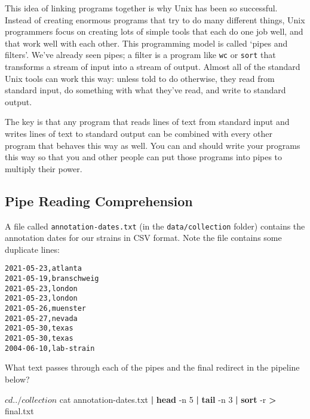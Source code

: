 \documentclass[
]{book}
\newenvironment{Shaded}{\begin{snugshade}}{\end{snugshade}}
\newcommand{\AttributeTok}[1]{\textcolor[rgb]{0.13,0.29,0.53}{#1}}
\newcommand{\ExtensionTok}[1]{#1}
\newcommand{\FunctionTok}[1]{\textcolor[rgb]{0.13,0.29,0.53}{\textbf{#1}}}
\newcommand{\KeywordTok}[1]{\textcolor[rgb]{0.13,0.29,0.53}{\textbf{#1}}}
\newcommand{\NormalTok}[1]{#1}
\newcommand{\OperatorTok}[1]{\textcolor[rgb]{0.81,0.36,0.00}{\textbf{#1}}}
\begin{document}
This idea of linking programs together is why Unix has been so successful. Instead of creating enormous programs that try to do many different things, Unix programmers focus on creating lots of simple tools that each do one job well, and that work well with each other. This programming model is called `pipes and filters'. We've already seen pipes; a filter is a program like \texttt{wc} or \texttt{sort} that transforms a stream of input into a stream of output. Almost all of the standard Unix tools can work this way: unless told to do otherwise, they read from standard input, do something with what they've read, and write to standard output.

The key is that any program that reads lines of text from standard input and writes lines of text to standard output can be combined with every other program that behaves this way as well. You can and should write your programs this way so that you and other people can put those programs into pipes to multiply their power.

\subsection{Pipe Reading Comprehension}\label{pipe-reading-comprehension}

A file called \texttt{annotation-dates.txt} (in the \texttt{data/collection} folder) contains the annotation dates for our strains in CSV format. Note the file contains some duplicate lines:

\begin{verbatim}
2021-05-23,atlanta
2021-05-19,branschweig
2021-05-23,london
2021-05-23,london
2021-05-26,muenster
2021-05-27,nevada
2021-05-30,texas
2021-05-30,texas
2004-06-10,lab-strain
\end{verbatim}

What text passes through each of the pipes and the final redirect in the pipeline below?

\begin{Shaded}
\begin{Highlighting}[]
\ExtensionTok{$}\NormalTok{ cd ../collection}
\ExtensionTok{$}\NormalTok{ cat annotation{-}dates.txt }\KeywordTok{|} \FunctionTok{head} \AttributeTok{{-}n}\NormalTok{ 5 }\KeywordTok{|} \FunctionTok{tail} \AttributeTok{{-}n}\NormalTok{ 3 }\KeywordTok{|} \FunctionTok{sort} \AttributeTok{{-}r} \OperatorTok{\textgreater{}}\NormalTok{ final.txt}
\end{Highlighting}
\end{Shaded}
\end{document}
